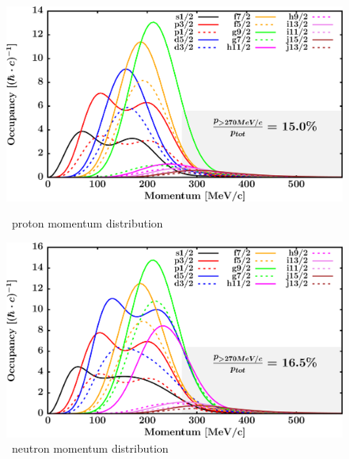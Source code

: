 \begin{figure}[hbtp]
    \centering
    \begin{minipage}{0.45\textwidth}
        \centering
        \includegraphics[width=\textwidth]{figures/sn124_protonLJMomentumDistIntegral.png}
        \caption*{\snFour\ proton momentum distribution}
        \label{DOMFitData_sn124_proton_momentumDist}
    \end{minipage}\hspace{6pt}
    \begin{minipage}{0.45\textwidth}
        \centering
        \includegraphics[width=\textwidth]{figures/sn124_neutronLJMomentumDistIntegral.png}
        \caption*{\snFour\ neutron momentum distribution}
        \label{DOMFitData_sn124_neutron_momentumDist}
    \end{minipage}
\end{figure}
\vspace{0.3in}
